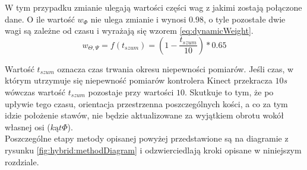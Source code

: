 W tym przypadku zmianie ulegają wartości części wag z jakimi zostają połączone dane. O ile wartość $w_\Phi$ nie ulega zmianie i wynosi $0.98$, o tyle pozostałe dwie wagi są zależne od czasu i wyrażają się wzorem \ref{eq:dynamicWeight}.
\begin{equation}
w_{\Theta,\Psi} = f(t_{szum}) = (1-\frac{t_{szum}}{10}) * 0.65
\label{eq:dynamicWeight}
\end{equation}

Wartość $t_{szum}$ oznacza czas trwania okresu niepewności pomiarów. Jeśli czas, w którym utrzymuje się niepewność pomiarów kontrolera Kinect przekracza $10s$ wówczas wartość $t_{szum}$ pozostaje przy wartości $10$. Skutkuje to tym, że po upływie tego czasu, orientacja przestrzenna poszczególnych kości, a co za tym idzie położenie stawów, nie będzie aktualizowane za wyjątkiem obrotu wokół własnej osi ($kąt \Phi$). \\


Poszczególne etapy metody opisanej powyżej przedstawione są na diagramie z rysunku \ref{fig:hybrid:methodDiagram} i odzwierciedlają kroki opisane w niniejszym rozdziale.